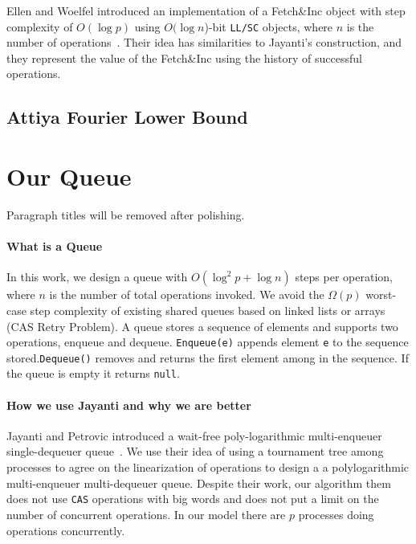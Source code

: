 \documentclass[10pt]{article}
\newcommand{\nf}[1]{{\normalfont{\texttt{#1}}}}
\theoremstyle{definition}
\begin{document}
Ellen and Woelfel introduced an implementation of a Fetch\&Inc object with step complexity of $O(\log p)$ using $O(\log n$)-bit \texttt{LL/SC} objects, where $n$ is the number of operations~\cite{10.1007/978-3-642-41527-2_20}. Their idea has similarities to Jayanti's construction, and they represent the value of the Fetch\&Inc using the history of successful operations. 




\subsection{Attiya Fourier Lower Bound}
\pagebreak

\pagebreak
\section{Our Queue}
Paragraph titles will be removed after polishing.

\paragraph{What is a Queue} In this work, we design a queue with $O(\log^2 p +\log n)$ steps per operation, where $n$ is the number of total operations invoked. We avoid the $\Omega(p)$ worst-case step complexity of existing shared queues based on linked lists or arrays (CAS Retry Problem). A queue stores a sequence of elements and supports two operations, enqueue and dequeue. \texttt{Enqueue(e)} appends element \texttt{e} to the sequence stored.\texttt{Dequeue()} removes and returns the first element among in the sequence. If the queue is empty it returns \texttt{null}.

\paragraph{How we use Jayanti and why we are better} Jayanti and Petrovic introduced a wait-free poly-logarithmic multi-enqueuer single-dequeuer queue~\cite{DBLP:conf/fsttcs/JayantiP05}. We use their idea of using a tournament tree among processes to agree on the linearization of operations to design a a polylogarithmic multi-enqueuer multi-dequeuer queue. Despite their work, our algorithm them does not use \texttt{CAS} operations with big words and does not put a limit on the number of concurrent operations. In our model there are $p$ processes doing \nf{Enqueue(),Dequeue()} operations concurrently.
\end{document}
